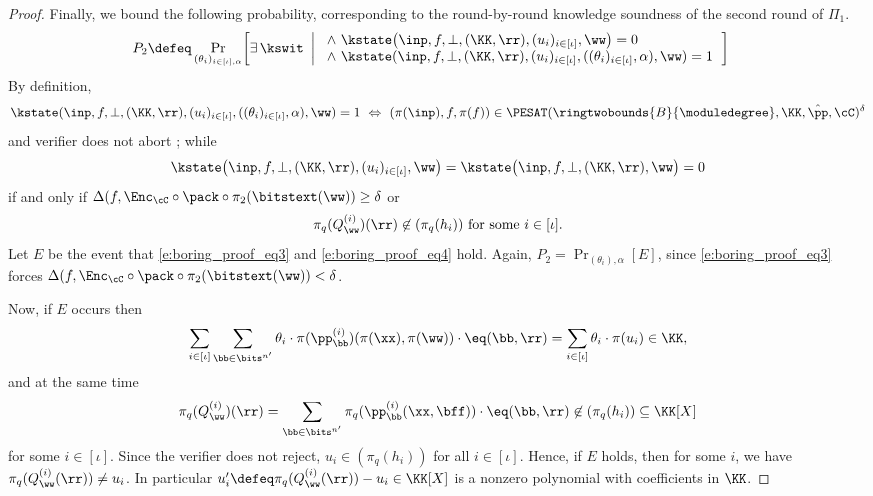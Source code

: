 \begin{proof}
Finally, we bound the following probability, corresponding to the round-by-round knowledge soundness of the second round of $\Pi_1$.
\begin{align*}
  P_2\defeq &\Pr_{(\theta_i)_{i\in[\iota], \alpha}}\!\left[
  \exists\,\kswit \ \left| \ \begin{array}{l}
  \wedge\ \kstate\bigl(\inp,f,\bot,(\KK,\rr), (u_i)_{i\in[\iota]},\ww\bigr)=0\\
  \wedge\ \kstate(\inp,f, \bot,(\KK,\rr),(u_i)_{i\in [\iota]},((\theta_i)_{i\in[\iota]},\alpha), \ww)=1
  \end{array}
  \right.\right] 
\end{align*}
%
By definition, \begin{equation}\label{e:boring_proof_eq3}\kstate(\inp,f, \bot,(\KK,\rr),(u_i)_{i\in [\iota]},((\theta_i)_{i\in[\iota]},\alpha), \ww)=1 \ \Leftrightarrow \ (\pi(\inp), f, \pi(f))\in \PESAT(\ringtwobounds{B}{\moduledegree}, \KK, \hat{\pp}, \cC)^\delta\end{equation} and verifier does not abort ; while $$\kstate\bigl(\inp,f,\bot,(\KK,\rr), (u_i)_{i\in[\iota]},\ww\bigr)=\kstate\bigl(\inp,f,\bot,(\KK,\rr),\ww\bigr)=0$$  if and only if 
$\Delta(f,\Enc_\cC\circ \pack \circ \pi_2(\bitstext(\ww)) \geq \delta$ or \begin{equation}\label{e:boring_proof_eq4}\pi_q(Q_{\ww}^{(i)})(\rr)\not\in (\pi_q(h_i)) \text{ for some } i\in [\iota].\end{equation}  
%
Let $E$ be the event that  \eqref{e:boring_proof_eq3} and \eqref{e:boring_proof_eq4} hold. Again, $P_2= \Pr_{(\theta_i),\alpha}[E]$, since \eqref{e:boring_proof_eq3} forces $\Delta(f,\Enc_\cC\circ \pack \circ \pi_2(\bitstext(\ww)) < \delta$.

Now, if $E$ occurs then
$$
\sum_{i\in [\iota]}\sum_{\bb\in \bits^{n'}}\theta_i\cdot \pi(\pp_\bb^{(i)})(\pi(\xx),\pi(\ww)) \cdot \eq(\bb, \rr) = \sum_{i\in [\iota]} \theta_i \cdot \pi(u_i) \in \KK,
$$
and at the same time 
$$
\pi_q(Q_{\ww}^{(i)})(\rr) = \sum_{\bb\in\bits^{n'}}\pi_q(\pp_{\bb}^{(i)}(\xx,\bff)) \cdot \eq(\bb,\rr) \not\in (\pi_q(h_i))\subseteq \KK[X]
$$
 for some $i\in [\iota]$. Since the verifier does not reject, $u_i \in (\pi_q(h_i))$ for all $i\in [\iota]$. Hence, if $E$ holds, then for some $i$, we have $\pi_q(Q_{\ww}^{(i)}(\rr)) \neq u_i$. In particular $u_i' \defeq \pi_q(Q_{\ww}^{(i)}(\rr)) - u_i \in \KK[X]$ is a nonzero polynomial with coefficients in $\KK$.


\end{proof}

